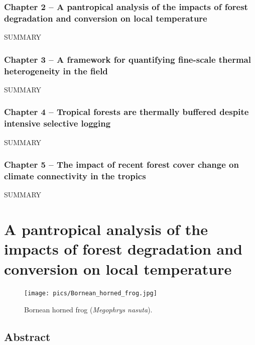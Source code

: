 \documentclass[12pt,a4paper,]{report}
\theoremstyle{definition}
\theoremstyle{definition}
\theoremstyle{definition}
\theoremstyle{remark}
\begin{document}
\subsection{Chapter 2 -- A pantropical analysis of the impacts of forest
degradation and conversion on local
temperature}\label{chapter-2-a-pantropical-analysis-of-the-impacts-of-forest-degradation-and-conversion-on-local-temperature}

SUMMARY

\subsection{Chapter 3 -- A framework for quantifying fine-scale thermal
heterogeneity in the
field}\label{chapter-3-a-framework-for-quantifying-fine-scale-thermal-heterogeneity-in-the-field}

SUMMARY

\subsection{Chapter 4 -- Tropical forests are thermally buffered despite
intensive selective
logging}\label{chapter-4-tropical-forests-are-thermally-buffered-despite-intensive-selective-logging}

SUMMARY

\subsection{Chapter 5 -- The impact of recent forest cover change on
climate connectivity in the
tropics}\label{chapter-5-the-impact-of-recent-forest-cover-change-on-climate-connectivity-in-the-tropics}

SUMMARY

\chapter{A pantropical analysis of the impacts of forest degradation and
conversion on local
temperature}\label{a-pantropical-analysis-of-the-impacts-of-forest-degradation-and-conversion-on-local-temperature}

\begin{figure}[!htb]
\centering
\texttt{[image: pics/Bornean\_horned\_frog.jpg]}
\caption*{Bornean horned frog (\textit{Megophrys nasuta}).}
\end{figure}

\pagebreak

\section{Abstract}\label{abstract-1}
\end{document}
